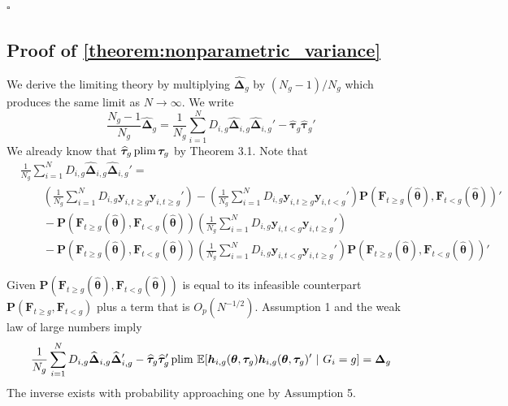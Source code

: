 \documentclass[12pt]{article}
\begin{document}
$\square$




\subsection*{Proof of \autoref{theorem:nonparametric_variance}}

We derive the limiting theory by multiplying $\widehat{\bm \Delta}_g$ by $(N_g-1)/N_g$ which produces the same limit as $N \rightarrow \infty$. We write
\begin{equation*}
    \frac{N_g - 1}{ N_g} \widehat{\bm \Delta}_g = \frac{1}{N_g} \sum_{i = 1}^N D_{i,g} \widehat{\bm \Delta}_{i,g} \widehat{\bm \Delta}_{i,g}' - \widehat{\bm \tau}_g \widehat{\bm \tau}_g'
\end{equation*}
We already know that $\widehat{\bm \tau}_g \operatorname{plim} \bm \tau_g$ by Theorem 3.1. Note that 
\begin{align*}
  &\frac{1}{N_g} \sum_{i = 1}^N D_{i,g} \widehat{\bm \Delta}_{i,g} \widehat{\bm \Delta}_{i,g}' =\\
  &\qquad \left( \frac{1}{N_g} \sum_{i = 1}^N D_{i,g}  \bm y_{i, t \geq g} \bm y_{i, t \geq g}' \right) - \left( \frac{1}{N_g} \sum_{i = 1}^N D_{i,g} \bm y_{i, t \geq g} \bm y_{i, t < g}' \right) \bm P(\bm{F}_{t \geq g}(\widehat{\bm{\theta}}), \bm{F}_{t < g}(\widehat{\bm{\theta}}))' \\
  &\qquad- \bm P(\bm{F}_{t \geq g}(\widehat{\bm{\theta}}), \bm{F}_{t < g}(\widehat{\bm{\theta}})) \left( \frac{1}{N_g} \sum_{i = 1}^N D_{i,g} \bm y_{i, t < g} \bm y_{i, t \geq g}' \right)\\
  &\qquad- \bm P(\bm{F}_{t \geq g}(\widehat{\bm{\theta}}), \bm{F}_{t < g}(\widehat{\bm{\theta}})) \left( \frac{1}{N_g} \sum_{i = 1}^N D_{i,g}  \bm y_{i, t < g} \bm y_{i, t \geq g}' \right) \bm P(\bm{F}_{t \geq g}(\widehat{\bm{\theta}}), \bm{F}_{t < g}(\widehat{\bm{\theta}}))'
\end{align*} 

Given $\bm P(\bm{F}_{t \geq g}(\widehat{\bm{\theta}}), \bm{F}_{t < g}(\widehat{\bm{\theta}}))$ is equal to its infeasible counterpart $\bm P(\bm{F}_{t \geq g}, \bm{F}_{t < g})$ plus a term that is $O_p(N^{-1/2})$. Assumption 1 and the weak law of large numbers imply 
\begin{equation*}
    \frac{1}{N_g} \sum_{i = 1}^N D_{i,g} \widehat{\bm \Delta}_{i,g} \widehat{\bm \Delta}_{i,g}' - \widehat{\bm \tau}_g \widehat{\bm \tau}_g' \plim \expec{\bm h_{i,g}(\bm{\theta}, \bm \tau_g) \bm h_{i,g}(\bm{\theta}, \bm \tau_g)'}{G_i = g} = \bm \Delta_g
\end{equation*}
The inverse exists with probability approaching one by Assumption 5.
\end{document}
